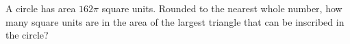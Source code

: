 A circle has area $162\pi$ square units. Rounded to the nearest whole number, how many square units are in the area of the largest triangle that can be inscribed in the circle?

